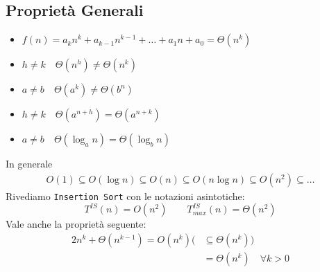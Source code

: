 \subsection{Proprietà Generali}
\begin{itemize}
	\item $f(n) = a_kn^k + a_{k-1}n^{k-1} + \dots + a_1n + a_0 = \Theta (n^k)$
	\item $h \neq k \quad \Theta (n^h) \neq \Theta (n^k)$
	\item $a \neq b \quad \Theta (a^k) \neq \Theta (b^n)$
	\item $h \neq k \quad \Theta (a^{n+h}) = \Theta (a^{n+k})$
	\item $a \neq b \quad \Theta (\log_an) = \Theta (\log_bn)$
\end{itemize} 
In generale
\begin{gather*}
	O(1) \subseteq O(\log n) \subseteq O(n) \subseteq O(n \log n) \subseteq O(n^2) \subseteq \dots
\end{gather*}
Rivediamo \texttt{Insertion Sort} con le notazioni asintotiche:
\begin{displaymath}
	T^{IS}(n) = O(n^2) \qquad T^{IS}_{max}(n) = \Theta (n^2)
\end{displaymath}
Vale anche la proprietà seguente:
\begin{align*}
	2n^k + \Theta (n^{k-1}) = O(n^k) (&\subseteq \Theta (n^k)) \\
	& = \Theta (n^k) \quad \forall k > 0
\end{align*}